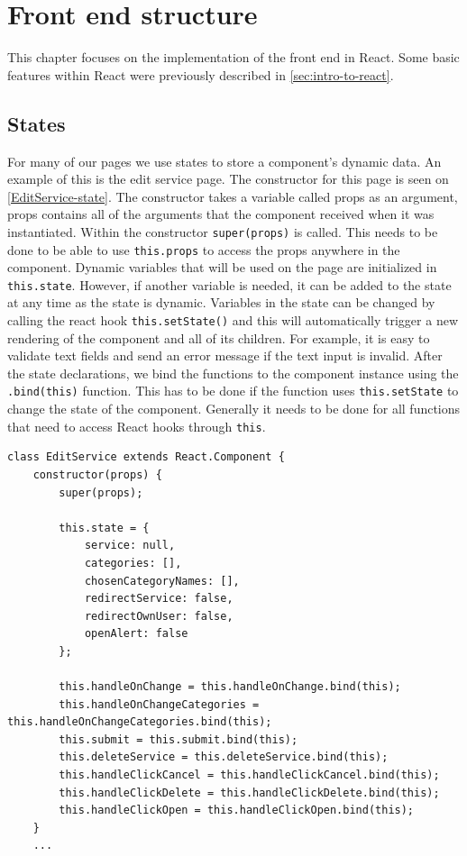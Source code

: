 \section{Front end structure}
This chapter focuses on the implementation of the front end in React.
Some basic features within React were previously described in \autoref{sec:intro-to-react}.

\subsection{States}
For many of our pages we use states to store a component's dynamic data. 
An example of this is the edit service page. 
The constructor for this page is seen on \autoref{EditService-state}.
The constructor takes a variable called props as an argument, props contains all of the arguments that the component received when it was instantiated. 
Within the constructor \texttt{super(props)} is called.
This needs to be done to be able to use \texttt{this.props} to access the props anywhere in the component.
Dynamic variables that will be used on the page are initialized in \texttt{this.state}. 
However, if another variable is needed, it can be added to the state at any time as the state is dynamic.
Variables in the state can be changed by calling the react hook \texttt{this.setState()} and this will automatically trigger a new rendering of the component and all of its children.
For example, it is easy to validate text fields and send an error message if the text input is invalid.  
After the state declarations, we bind the functions to the component instance using the \texttt{.bind(this)} function.
This has to be done if the function uses \texttt{this.setState} to change the state of the component.
Generally it needs to be done for all functions that need to access React hooks through \texttt{this}.
\begin{lstlisting}[caption={Constructor and state for edit service}, captionpos=b, label={EditService-state}]
class EditService extends React.Component {
    constructor(props) {
        super(props);
    
        this.state = {
            service: null,
            categories: [],
            chosenCategoryNames: [],
            redirectService: false,
            redirectOwnUser: false,
            openAlert: false
        };
            
        this.handleOnChange = this.handleOnChange.bind(this);
        this.handleOnChangeCategories = this.handleOnChangeCategories.bind(this);
        this.submit = this.submit.bind(this);
        this.deleteService = this.deleteService.bind(this);
        this.handleClickCancel = this.handleClickCancel.bind(this);
        this.handleClickDelete = this.handleClickDelete.bind(this);
        this.handleClickOpen = this.handleClickOpen.bind(this);
    }
    ...
\end{lstlisting}

